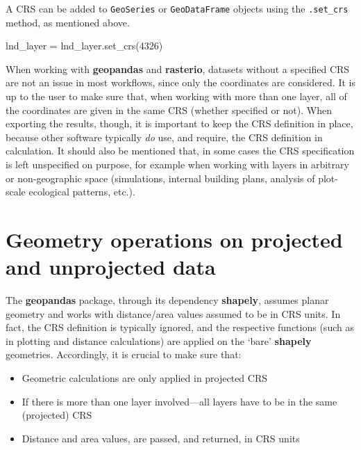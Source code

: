 \documentclass[
  letterpaper,
]{krantz}
\newenvironment{Shaded}{\begin{snugshade}}{\end{snugshade}}
\newcommand{\DecValTok}[1]{\textcolor[rgb]{0.68,0.00,0.00}{#1}}
\newcommand{\NormalTok}[1]{\textcolor[rgb]{0.00,0.23,0.31}{#1}}
\newcommand{\OperatorTok}[1]{\textcolor[rgb]{0.37,0.37,0.37}{#1}}
\providecommand{\tightlist}{%
  \setlength{\itemsep}{0pt}\setlength{\parskip}{0pt}}\usepackage{longtable,booktabs,array}
\begin{document}
A CRS can be added to \texttt{GeoSeries} or \texttt{GeoDataFrame}
objects using the \texttt{.set\_crs} method, as mentioned above.

\begin{Shaded}
\begin{Highlighting}[]
\NormalTok{lnd\_layer }\OperatorTok{=}\NormalTok{ lnd\_layer.set\_crs(}\DecValTok{4326}\NormalTok{)}
\end{Highlighting}
\end{Shaded}

When working with \textbf{geopandas} and \textbf{rasterio}, datasets
without a specified CRS are not an issue in most workflows, since only
the coordinates are considered. It is up to the user to make sure that,
when working with more than one layer, all of the coordinates are given
in the same CRS (whether specified or not). When exporting the results,
though, it is important to keep the CRS definition in place, because
other software typically \emph{do} use, and require, the CRS definition
in calculation. It should also be mentioned that, in some cases the CRS
specification is left unspecified on purpose, for example when working
with layers in arbitrary or non-geographic space (simulations, internal
building plans, analysis of plot-scale ecological patterns, etc.).

\section{Geometry operations on projected and unprojected
data}\label{sec-geometry-operations-on-projected-and-unprojected-data}

The \textbf{geopandas} package, through its dependency \textbf{shapely},
assumes planar geometry and works with distance/area values assumed to
be in CRS units. In fact, the CRS definition is typically ignored, and
the respective functions (such as in plotting and distance calculations)
are applied on the `bare' \textbf{shapely} geometries. Accordingly, it
is crucial to make sure that:

\begin{itemize}
\tightlist
\item
  Geometric calculations are only applied in projected CRS
\item
  If there is more than one layer involved---all layers have to be in
  the same (projected) CRS
\item
  Distance and area values, are passed, and returned, in CRS units
\end{itemize}
\end{document}
